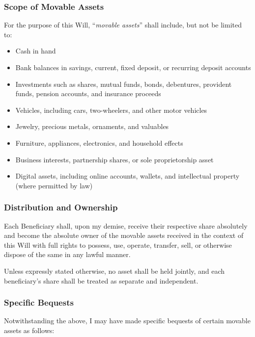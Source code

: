 \subsubsection*{Scope of Movable Assets}
For the purpose of this Will, “\textit{movable assets}” shall include, but not be limited to:

\begin{itemize}
  \item Cash in hand
  \item Bank balances in savings, current, fixed deposit, or recurring deposit accounts
  \item Investments such as shares, mutual funds, bonds, debentures, provident funds, pension accounts, and insurance proceeds
  \item Vehicles, including cars, two-wheelers, and other motor vehicles
  \item Jewelry, precious metals, ornaments, and valuables
  \item Furniture, appliances, electronics, and household effects
  \item Business interests, partnership shares, or sole proprietorship asset
  \item Digital assets, including online accounts, wallets, and intellectual property (where permitted by law)
\end{itemize}

\subsubsection*{Distribution and Ownership}
Each Beneficiary shall, upon my demise, receive their respective share absolutely and become the absolute owner of the movable assets received in the context of this Will with full rights to possess, use, operate, transfer, sell, or otherwise dispose of the same in any lawful manner.

\vspace{0.2 cm}

\noindent Unless expressly stated otherwise, no asset shall be held jointly, and each beneficiary’s share shall be treated as separate and independent.

\subsubsection*{Specific Bequests}
Notwithstanding the above, I may have made specific bequests of certain movable assets as follows:

\vspace{0.3cm}

